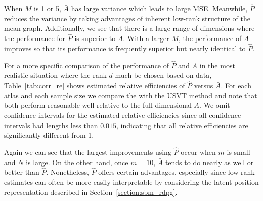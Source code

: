 \documentclass[10pt,letterpaper]{article}
\begin{document}
When $M$ is 1 or 5, $\bar{A}$ has large variance which leads to large MSE. Meanwhile, $\hat{P}$ reduces the variance by taking advantages of inherent low-rank structure of the mean graph. Additionally, we see that there is a large range of dimensions where the performance for $\hat{P}$ is superior to $\bar{A}$. 
With a larger $M$, the performance of $\bar{A}$ improves so that its performance is frequently superior but nearly identical to $\hat{P}$.

For a more specific comparison of the performance of $\hat{P}$ and $\bar{A}$ in the most realistic situation where the rank $d$ much be chosen based on data, Table~\ref{tab:corr_re} shows estimated relative efficiencies of $\hat{P}$ versus $\bar{A}$.
For each atlas and each sample size we compare the \citet{zhu2006automatic} with the USVT method and note that both perform reasonable well relative to the full-dimensional $\bar{A}$.
We omit confidence intervals for the estimated relative efficiencies since all confidence intervals had lengths less than $0.015$, indicating that all relative efficiencies are significantly different from 1.

Again we can see that the largest improvements using $\hat{P}$ occur when $m$ is small and $N$ is large. 
On the other hand, once $m=10$, $\bar{A}$ tends to do nearly as well or better than $\hat{P}$. 
Nonetheless, $\hat{P}$ offers certain advantages, especially since low-rank estimates can often be more easily interpretable by considering the latent position representation described in Section~\ref{section:sbm_rdpg}.
\end{document}
